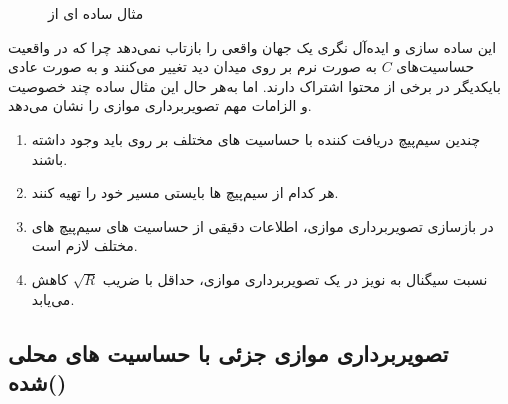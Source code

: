 \begin{figure}[t!]
\begin{RTLcopyrightBox}{\linewidth}{}
{			\label{subfig:pMRI-rec-d}}
		\hfill
	\end{RTLcopyrightBox}
	\removevspace[2.5]
	\caption{مثال ساده ای از }
	\label{fig:pMRI-rec}
\end{figure}



این ساده سازی و ایده‌آل نگری یک جهان واقعی را بازتاب نمی‌دهد چرا که در واقعیت حساسیت‌های $C$ 
به صورت نرم
بر روی میدان دید 
تغییر می‌کنند و به صورت عادی بایکدیگر در برخی از محتوا اشتراک دارند. اما به‌هر حال این مثال ساده چند خصوصیت و الزامات مهم تصویربرداری موازی را نشان می‌دهد.
\cite{SMASH-SENSE-PILS-GRAPPA--2004}

\begin{enumerate}
	\item
	چندین سیم‌پیچ دریافت کننده با حساسیت های مختلف بر روی 
باید وجود داشته باشند.
	\item
هر کدام از سیم‌پیچ ها بایستی مسیر خود را تهیه کنند.
\item
در بازسازی تصویربرداری موازی، اطلاعات دقیقی از حساسیت های سیم‌پیچ های مختلف لازم است.
\item
نسبت سیگنال به نویز در یک تصویربرداری موازی، حداقل با ضریب $\sqrt{R}$ کاهش می‌یابد.
\end{enumerate}

\FloatBarrier
\subsection{تصویربرداری موازی جزئی با حساسیت های محلی شده()}


